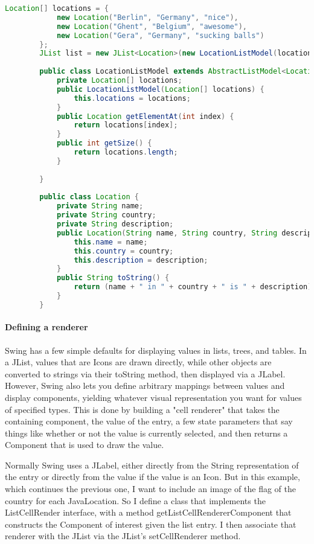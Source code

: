  \begin{lstlisting}[language=java]
        Location[] locations = {
			new Location("Berlin", "Germany", "nice"),
			new Location("Ghent", "Belgium", "awesome"),
			new Location("Gera", "Germany", "sucking balls")
		};
		JList list = new JList<Location>(new LocationListModel(locations));
		
		public class LocationListModel extends AbstractListModel<Location>{
        	private Location[] locations;
        	public LocationListModel(Location[] locations) {
        		this.locations = locations;
        	}
        	public Location getElementAt(int index) {
        		return locations[index];
        	}
        	public int getSize() {
        		return locations.length;
        	}
        
        }
        
        public class Location {
        	private String name;
        	private String country;
        	private String description;
        	public Location(String name, String country, String description) {
        		this.name = name;
        		this.country = country;
        		this.description = description;
        	}
        	public String toString() {
        		return (name + " in " + country + " is " + description);
        	}
        }
 \end{lstlisting}
 
 \paragraph{Defining a renderer} Swing has a few simple defaults for displaying values in lists, trees, and tables. In a JList, values that are Icons are drawn directly, while other objects are converted to strings via their toString method, then displayed via a JLabel. However, Swing also lets you define arbitrary mappings between values and display components, yielding whatever visual representation you want for values of specified types. This is done by building a "cell renderer" that takes the containing component, the value of the entry, a few state parameters that say things like whether or not the value is currently selected, and then returns a Component that is used to draw the value. 
 
Normally Swing uses a JLabel, either directly from the String representation of the entry or directly from the value if the value is an Icon. But in this example, which continues the previous one, I want to include an image of the flag of the country for each JavaLocation. So I define a class that implements the ListCellRender interface, with a method getListCellRendererComponent that constructs the Component of interest given the list entry. I then associate that renderer with the JList via the JList's setCellRenderer method. 

